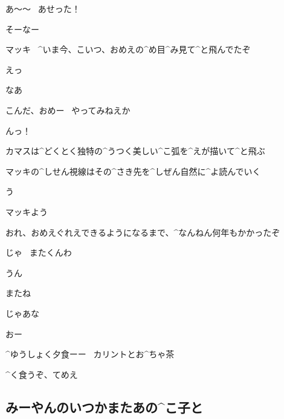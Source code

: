 \page[157]
\Makki あ〜〜
\ あせった！

\Ayase そーなー

\Ayase マッキ
\ ^{いま}{今}、こいつ、おめえの^{め}{目}^{み}{見}て^{と}{飛}んでたぞ

\Makki えっ

\Ayase なあ

\Ayase こんだ、おめー
\ やってみねえか

\page
\Makki んっ！

\page
\Ayase カマスは^{どくとく}{独特}の^{うつく}{美}しい^{こ}{弧}を^{えが}{描}いて^{と}{飛}ぶ

\Ayase マッキの^{しせん}{視線}はその^{さき}{先}を^{しぜん}{自然}に^{よ}{読}んでいく

\page
\Makki う

\Ayase マッキよう

\Ayase おれ、おめえぐれえできるようになるまで、^{なんねん}{何年}もかかったぞ

\page
\Ayase じゃ
\ またくんわ

\Makki うん

\page
\Makki またね

\Ayase じゃあな

\Makki おー

\page[164]
\Ayase ^{ゆうしょく}{夕食}ーー
\ カリントとお^{ちゃ}{茶}

\Ayase ^{く}{食}うぞ、てめえ


\subsection{みーやんのいつかまたあの^{こ}{子}と}
